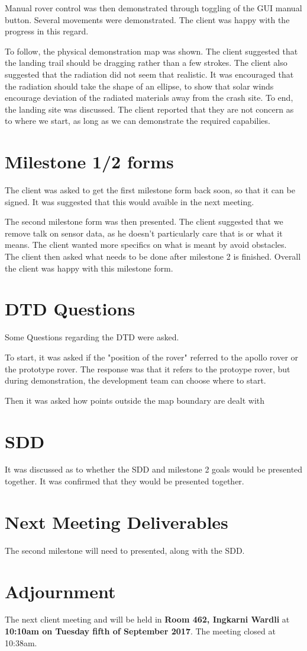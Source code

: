 \documentclass{article}
\begin{document}
Manual rover control was then demonstrated through toggling of the GUI manual button. Several movements were demonstrated. The client was happy with the progress in this regard. 

To follow, the physical demonstration map was shown. The client suggested that the landing trail should be dragging rather than a few strokes. The client also suggested that the radiation did not seem that realistic. It was encouraged that the radiation should take the shape of an ellipse, to show that solar winds encourage deviation of the radiated materials away from the crash site. To end, the landing site was discussed. The client reported that they are not concern as to where we start, as long as we can demonstrate the required capabilies. 

\section{Milestone 1/2 forms}
The client was asked to get the first milestone form back soon, so that it can be signed. It was suggested that this would avaible in the next meeting. 

The second milestone form was then presented. The client suggested that we remove talk on sensor data, as he doesn't particularly care that is or what it means. The client wanted more specifics on what is meant by avoid obstacles. The client then asked what needs to be done after milestone 2 is finished. Overall the client was happy with this milestone form. 

\section{DTD Questions}
Some Questions regarding the DTD were asked.

To start, it was asked if the "position of the rover" referred to the apollo rover or the prototype rover. The response was that it refers to the protoype rover, but during demonstration, the development team can choose where to start. 

Then it was asked how points outside the map boundary are dealt with 


\section{SDD}
It was discussed as to whether the SDD and milestone 2 goals would be presented together. It was confirmed that they would be presented together. 

\section{Next Meeting Deliverables}
The second milestone will need to presented, along with the SDD. 

\section{Adjournment}
    The next client meeting and will be held in {\bf Room 462, Ingkarni Wardli} at {\bf 10:10am on Tuesday fifth of September 2017}.
The meeting closed at 10:38am.
\end{document}
